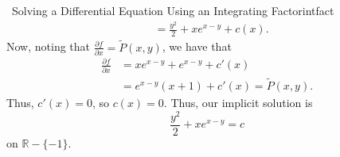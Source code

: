 \begin{example}{\Difficulty\,\Difficulty\,\,Solving a Differential Equation Using an Integrating Factor}{intfact}
\begin{align*}
                &=\frac{y^2}{2}+xe^{x-y}+c(x).
            \end{align*}
            Now, noting that \(\frac{\partial f}{\partial x}=\tilde{P}(x,y)\), we have that
            \begin{align*}
                \frac{\partial f}{\partial x}&=xe^{x-y}+e^{x-y}+c'(x) \\
                &=e^{x-y}(x+1)+c'(x)=\tilde{P}(x,y).
            \end{align*} 
            Thus, \(c'(x)=0\), so \(c(x)=0\). Thus, our implicit solution is
            \begin{equation*}
                \frac{y^2}{2}+xe^{x-y}=c
            \end{equation*}
            on \(\mathbb{R}-\{-1\}\).
        \end{example}